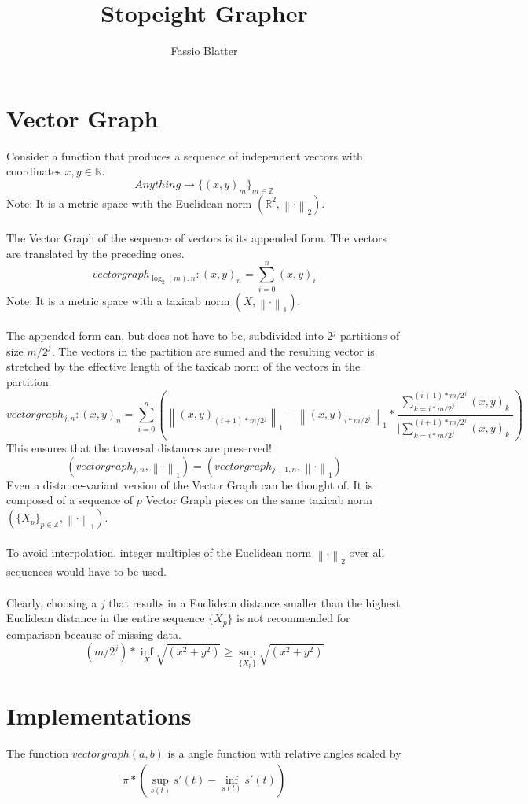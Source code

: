\documentclass{report}
\newcommand\norm[1]{\left\lVert#1\right\rVert}
\begin{document}
\title{Stopeight Grapher}
\author{Fassio Blatter}
\maketitle

\chapter{Vector Graph}
Consider a function that produces a sequence of independent vectors with coordinates $x,y \in \mathbb{R}$.
\begin{equation}
Anything \rightarrow \{(x,y)_{m}\}_{m \in \mathbb{Z}}
\end{equation}
Note: It is a metric space with the Euclidean norm $(\mathbb{R}^2,\norm{\cdot}_2)$.\\\\
The Vector Graph of the sequence of vectors is its appended form. The vectors are translated by the preceding ones.\\
\begin{equation}
vectorgraph_{\log_{2}(m),n}: (x,y)_{n}=\sum_{i=0}^{n} (x,y)_{i}
\end{equation}
Note: It is a metric space with a taxicab norm $(X,\norm{\cdot}_1)$.\\\\
The appended form can, but does not have to be, subdivided into $2^j$ partitions of size $m/2^j$. The vectors in the partition are sumed and the resulting vector is stretched by the effective length of the taxicab norm of the vectors in the partition.
\begin{equation}
vectorgraph_{j,n}:(x,y)_{n}=\sum_{i=0}^{n} (\norm{(x,y)_{(i+1)*m/2^j}}_{1} - \norm{(x,y)_{i*m/2^j}}_{1} * \frac{\sum_{k=i*m/2^j}^{(i+1)*m/2^j} (x,y)_{k}}{\vert \sum_{k=i*m/2^j}^{(i+1)*m/2^j} (x,y)_{k} \vert})
\end{equation}
This ensures that the traversal distances are preserved!
\begin{equation}
(vectorgraph_{j,n},\norm{\cdot}_{1})=(vectorgraph_{j+1,n},\norm{\cdot}_{1})
\end{equation}
Even a distance-variant version of the Vector Graph can be thought of. It is composed of a sequence of $p$ Vector Graph pieces on the same taxicab norm $(\{X_{p}\}_{p\in \mathbb{Z}},\norm{\cdot}_1)$.\\\\
To avoid interpolation, integer multiples of the Euclidean norm $\norm{\cdot}_{2}$ over all sequences would have to be used.\\\\
Clearly, choosing a $j$ that results in a Euclidean distance smaller than the highest Euclidean distance in the entire sequence $\{X_{p}\}$ is not recommended for comparison because of missing data.
\begin{equation}
(m/2^j)*\inf \limits _{X} \sqrt{(x^2+y^2)} \geq \sup \limits _{\{X_{p}\}} \sqrt{(x^2+y^2)}
\end{equation}

\chapter{Implementations}
The function $vectorgraph(a,b)$ is a angle function with relative angles scaled by
\begin{align}
\pi*(\sup_{s(t)} s'(t)-\inf_{s(t)} s'(t))
\end{align}

\iffalse
\printbibliography
\fi
{}

\end{document}
